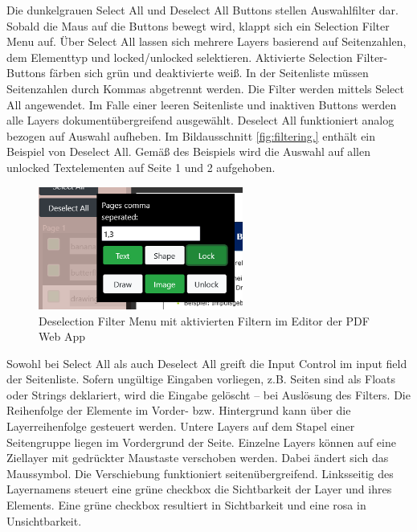 Die dunkelgrauen Select All und Deselect All Buttons stellen Auswahlfilter dar. Sobald die Maus auf die Buttons bewegt wird, klappt sich ein Selection Filter Menu auf. Über Select All lassen sich mehrere Layers basierend auf Seitenzahlen, dem Elementtyp und locked/unlocked selektieren. Aktivierte Selection Filter-Buttons färben sich grün und deaktivierte weiß. In der Seitenliste müssen Seitenzahlen durch Kommas abgetrennt werden. Die Filter werden mittels Select All angewendet. Im Falle einer leeren Seitenliste und inaktiven Buttons werden alle Layers dokumentübergreifend ausgewählt. Deselect All funktioniert analog bezogen auf Auswahl aufheben. Im Bildausschnitt \ref{fig:filtering.} enthält ein Beispiel von Deselect All. Gemäß des Beispiels wird die Auswahl auf allen unlocked Textelementen auf Seite 1 und 2 aufgehoben. 

\begin{figure}[!htbp]
	\centering
	\includegraphics[width=0.6\textwidth]{"images/filtering.png"}
	\caption{Deselection Filter Menu mit aktivierten Filtern im Editor der PDF Web App}
	\label{fig:filtering}
\end{figure}

Sowohl bei Select All als auch Deselect All greift die Input Control im input field der Seitenliste. Sofern ungültige Eingaben vorliegen, z.B. Seiten sind als Floats oder Strings deklariert, wird die Eingabe gelöscht – bei Auslösung des Filters. Die Reihenfolge der Elemente im Vorder- bzw. Hintergrund kann über die Layerreihenfolge gesteuert werden. Untere Layers auf dem Stapel einer Seitengruppe liegen im Vordergrund der Seite. Einzelne Layers können auf eine Ziellayer mit gedrückter Maustaste verschoben werden. Dabei ändert sich das Maussymbol. Die Verschiebung funktioniert seitenübergreifend. Linksseitig des Layernamens steuert eine grüne checkbox die Sichtbarkeit der Layer und ihres Elements. Eine grüne checkbox resultiert in Sichtbarkeit und eine rosa in Unsichtbarkeit. 

